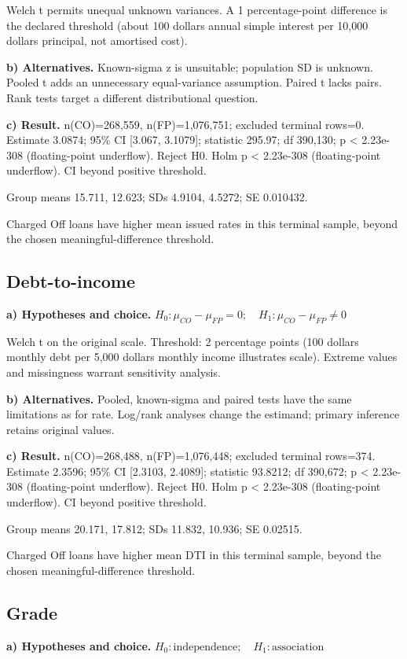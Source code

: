 \documentclass[10pt,a4paper,twocolumn]{article}
\begin{document}
Welch t permits unequal unknown variances. A 1 percentage-point difference is the declared threshold (about 100 dollars annual simple interest per 10,000 dollars principal, not amortised cost).

\textbf{b) Alternatives.} Known-sigma z is unsuitable; population SD is unknown. Pooled t adds an unnecessary equal-variance assumption. Paired t lacks pairs. Rank tests target a different distributional question.

\textbf{c) Result.} n(CO)=268,559, n(FP)=1,076,751; excluded terminal rows=0. Estimate 3.0874; 95\% CI [3.067, 3.1079]; statistic 295.97; df 390,130; p < 2.23e-308 (floating-point underflow). Reject H0. Holm p < 2.23e-308 (floating-point underflow). CI beyond positive threshold.

Group means 15.711, 12.623; SDs 4.9104, 4.5272; SE 0.010432.

Charged Off loans have higher mean issued rates in this terminal sample, beyond the chosen meaningful-difference threshold.


\subsection{Debt-to-income}
\textbf{a) Hypotheses and choice.} \(H_0:\mu_{CO}-\mu_{FP}=0;\quad H_1:\mu_{CO}-\mu_{FP}\ne0\)

Welch t on the original scale. Threshold: 2 percentage points (100 dollars monthly debt per 5,000 dollars monthly income illustrates scale). Extreme values and missingness warrant sensitivity analysis.

\textbf{b) Alternatives.} Pooled, known-sigma and paired tests have the same limitations as for rate. Log/rank analyses change the estimand; primary inference retains original values.

\textbf{c) Result.} n(CO)=268,488, n(FP)=1,076,448; excluded terminal rows=374. Estimate 2.3596; 95\% CI [2.3103, 2.4089]; statistic 93.8212; df 390,672; p < 2.23e-308 (floating-point underflow). Reject H0. Holm p < 2.23e-308 (floating-point underflow). CI beyond positive threshold.

Group means 20.171, 17.812; SDs 11.832, 10.936; SE 0.02515.

Charged Off loans have higher mean DTI in this terminal sample, beyond the chosen meaningful-difference threshold.


\subsection{Grade}
\textbf{a) Hypotheses and choice.} \(H_0:\text{independence};\quad H_1:\text{association}\)
\end{document}
